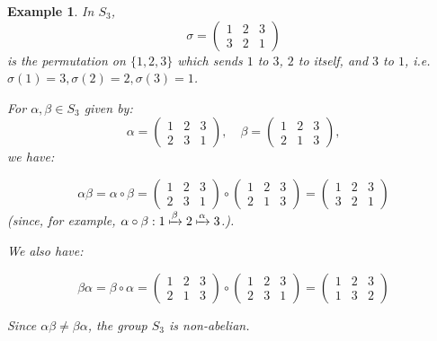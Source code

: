\documentclass[a4paper,12pt]{report}
\newcounter{statement}
\numberwithin{statement}{chapter}
\newtheorem{eg}[statement]{\bf Example}
\numberwithin{equation}{chapter}
\numberwithin{section}{chapter}
\numberwithin{subsection}{section}
\begin{document}
\begin{eg}
In $S_3$,
\[
\sigma = \left(
\begin{matrix}
1 & 2 & 3\\
3 & 2 & 1
\end{matrix}
\right)
\]
is the permutation on $\{1, 2, 3\}$
which sends $1$ to $3$, $2$ to itself, and $3$ to $1$,
i.e. $\sigma(1) = 3, \sigma(2) = 2, \sigma(3) = 1$.




For $\alpha, \beta \in S_3$ given by:
\[
\alpha =
\left(
\begin{matrix}
1 & 2 & 3\\
2 & 3 & 1
\end{matrix}\right),
\quad
\beta =
\left(\begin{matrix}
1 & 2 & 3\\
2 & 1 & 3
\end{matrix}\right),
\]
we have:




\[
\alpha\beta = \alpha\circ\beta
=
\left(\begin{matrix}
1 & 2 & 3\\
2 & 3 & 1
\end{matrix}\right) \circ
\left(\begin{matrix}
1 & 2 & 3\\
2 & 1 & 3
\end{matrix}\right)
=\left(\begin{matrix}
1 & 2 & 3\\
3 & 2 & 1
\end{matrix}\right)
\]
(since, for example, $\alpha\circ\beta: 1 \xmapsto{\beta} 2 \xmapsto{\alpha} 3$.).



We also have:




\[
\beta\alpha = \beta\circ\alpha
= \left(\begin{matrix}
1 & 2 & 3\\
2 & 1 & 3
\end{matrix}\right) \circ
\left(\begin{matrix}
1 & 2 & 3\\
2 & 3 & 1
\end{matrix}\right)
=
\left(\begin{matrix}
1 & 2 & 3\\
1 & 3 & 2
\end{matrix}\right)
\]

Since $\alpha\beta \neq \beta\alpha$, the group $S_3$ is non-abelian.





\end{eg}
\end{document}
